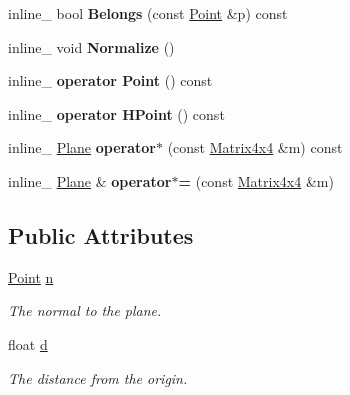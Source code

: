 \begin{DoxyCompactItemize}
\item 
inline\+\_\+ bool {\bfseries Belongs} (const \hyperlink{classOpcode_1_1Point}{Point} \&p) const \hypertarget{classOpcode_1_1Plane_a8a4a5103367e70ab0cb32ffe725aeb1c}{}\label{classOpcode_1_1Plane_a8a4a5103367e70ab0cb32ffe725aeb1c}

\item 
inline\+\_\+ void {\bfseries Normalize} ()\hypertarget{classOpcode_1_1Plane_aa5c1f3566999649058defe328447b17e}{}\label{classOpcode_1_1Plane_aa5c1f3566999649058defe328447b17e}

\item 
inline\+\_\+ {\bfseries operator Point} () const \hypertarget{classOpcode_1_1Plane_a460e8f613c7b67a36c34d1749f513ba1}{}\label{classOpcode_1_1Plane_a460e8f613c7b67a36c34d1749f513ba1}

\item 
inline\+\_\+ {\bfseries operator H\+Point} () const \hypertarget{classOpcode_1_1Plane_a872a0258de1996c341c2a9dfcc7e4718}{}\label{classOpcode_1_1Plane_a872a0258de1996c341c2a9dfcc7e4718}

\item 
inline\+\_\+ \hyperlink{classOpcode_1_1Plane}{Plane} {\bfseries operator$\ast$} (const \hyperlink{classOpcode_1_1Matrix4x4}{Matrix4x4} \&m) const \hypertarget{classOpcode_1_1Plane_a5924334bb590596c1ee79d56590f4efb}{}\label{classOpcode_1_1Plane_a5924334bb590596c1ee79d56590f4efb}

\item 
inline\+\_\+ \hyperlink{classOpcode_1_1Plane}{Plane} \& {\bfseries operator$\ast$=} (const \hyperlink{classOpcode_1_1Matrix4x4}{Matrix4x4} \&m)\hypertarget{classOpcode_1_1Plane_acbdc4773bb096ba1d00834ef24c5ab7d}{}\label{classOpcode_1_1Plane_acbdc4773bb096ba1d00834ef24c5ab7d}

\end{DoxyCompactItemize}
\subsection*{Public Attributes}
\begin{DoxyCompactItemize}
\item 
\hyperlink{classOpcode_1_1Point}{Point} \hyperlink{classOpcode_1_1Plane_adb0176a77163295160a715367227d68a}{n}\hypertarget{classOpcode_1_1Plane_adb0176a77163295160a715367227d68a}{}\label{classOpcode_1_1Plane_adb0176a77163295160a715367227d68a}

\begin{DoxyCompactList}\small\item\em The normal to the plane. \end{DoxyCompactList}\item 
float \hyperlink{classOpcode_1_1Plane_a93a3e9c381229709ef5749fe1c0f5c5b}{d}\hypertarget{classOpcode_1_1Plane_a93a3e9c381229709ef5749fe1c0f5c5b}{}\label{classOpcode_1_1Plane_a93a3e9c381229709ef5749fe1c0f5c5b}

\begin{DoxyCompactList}\small\item\em The distance from the origin. \end{DoxyCompactList}\end{DoxyCompactItemize}


